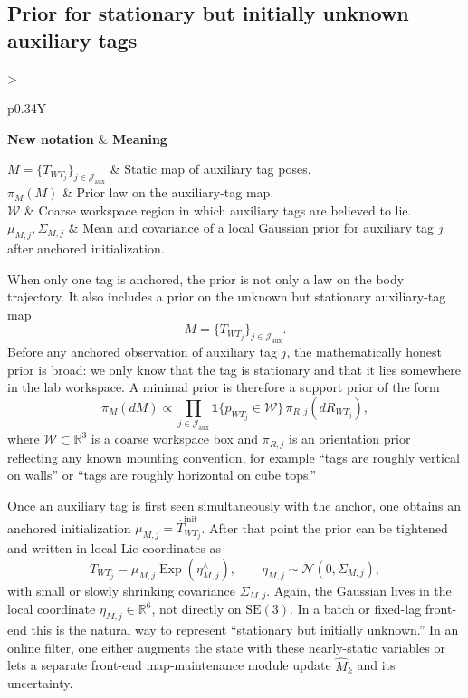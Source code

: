 \documentclass[11pt]{report}
\newcommand{\SE}{\mathrm{SE}(3)}
\newcommand{\R}{\mathbb{R}}
\newcommand{\Exp}{\operatorname{Exp}}
\newcommand{\NotationTable}[1]{%
\vspace{0.6mm}
{\scriptsize
\setlength{\tabcolsep}{2.5pt}
\begin{tabularx}{\columnwidth}{>{\raggedright\arraybackslash}p{0.34\columnwidth}Y}
\toprule
\textbf{New notation} & \textbf{Meaning}\\
\midrule
#1\\
\bottomrule
\end{tabularx}}
\vspace{0.8mm}}
\begin{document}
\subsection{Prior for stationary but initially unknown auxiliary tags}
\NotationTable{
$M=\{T_{WT_j}\}_{j\in\mathcal J_{\mathrm{aux}}}$ & Static map of auxiliary tag poses.\\
$\pi_M(M)$ & Prior law on the auxiliary-tag map.\\
$\mathcal W$ & Coarse workspace region in which auxiliary tags are believed to lie.\\
$\mu_{M,j},\Sigma_{M,j}$ & Mean and covariance of a local Gaussian prior for auxiliary tag $j$ after anchored initialization.}

When only one tag is anchored, the prior is not only a law on the body trajectory. It also includes a prior on the unknown but stationary auxiliary-tag map
\begin{equation}
M=\{T_{WT_j}\}_{j\in\mathcal J_{\mathrm{aux}}}.
\end{equation}
Before any anchored observation of auxiliary tag $j$, the mathematically honest prior is broad: we only know that the tag is stationary and that it lies somewhere in the lab workspace. A minimal prior is therefore a support prior of the form
\begin{equation}
\pi_M(dM) \propto \prod_{j\in\mathcal J_{\mathrm{aux}}} \mathbf 1\{p_{WT_j}\in\mathcal W\}\,\pi_{R,j}(dR_{WT_j}),
\label{eq:workspace_prior_aux_tags}
\end{equation}
where $\mathcal W\subset\R^3$ is a coarse workspace box and $\pi_{R,j}$ is an orientation prior reflecting any known mounting convention, for example ``tags are roughly vertical on walls'' or ``tags are roughly horizontal on cube tops.''

Once an auxiliary tag is first seen simultaneously with the anchor, one obtains an anchored initialization $\mu_{M,j}=\widehat T_{WT_j}^{\mathrm{init}}$. After that point the prior can be tightened and written in local Lie coordinates as
\begin{equation}
T_{WT_j}=\mu_{M,j}\Exp(\eta_{M,j}^\wedge),
\qquad
\eta_{M,j}\sim\mathcal N(0,\Sigma_{M,j}),
\label{eq:local_aux_map_prior}
\end{equation}
with small or slowly shrinking covariance $\Sigma_{M,j}$. Again, the Gaussian lives in the local coordinate $\eta_{M,j}\in\R^6$, not directly on $\SE$. In a batch or fixed-lag front-end this is the natural way to represent ``stationary but initially unknown.'' In an online filter, one either augments the state with these nearly-static variables or lets a separate front-end map-maintenance module update $\widehat M_k$ and its uncertainty.
\end{document}
